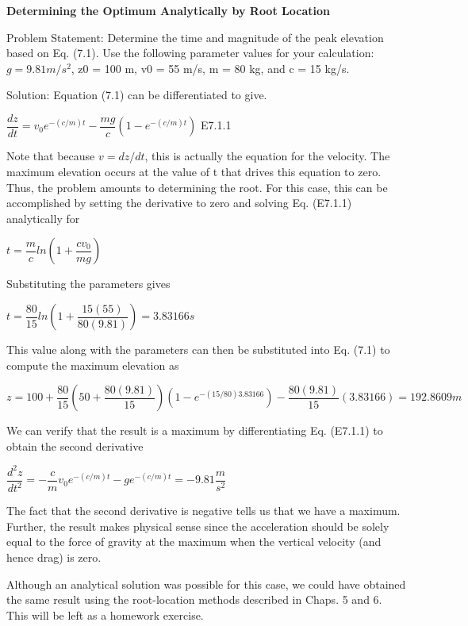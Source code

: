 \documentclass[../main.tex]{subfiles}
\begin{document}
\begin{example}
	\textbf{Determining the Optimum Analytically by Root Location}
	\smallskip
	
	\noindent Problem Statement:
	Determine the time and magnitude of the peak elevation based on
	Eq. (7.1). Use the following parameter values for your calculation: $g = 9.81 m/s^2$,
	z0 = 100 m, v0 = 55 m/s, m = 80 kg, and c = 15 kg/s.

	\noindent Solution: Equation (7.1) can be differentiated to give.
	\medskip

	$\dfrac{dz}{dt}=v_0e^{-(c/m)t}-\dfrac{mg}{c}(1-e^{-(c/m)t})$ \hfill{E7.1.1}
	\medskip

	\noindent Note that because $v = dz/dt$, this is actually the equation for the velocity. The maximum
	elevation occurs at the value of t that drives this equation to zero. Thus, the problem
	amounts to determining the root. For this case, this can be accomplished by setting the derivative
	to zero and solving Eq. (E7.1.1) analytically for
	\medskip

	$t = \dfrac{m}{c}ln(1+\dfrac{cv_0}{mg})$
	\medskip

	\noindent Substituting the parameters gives
	\medskip

	$t=\dfrac{80}{15}ln(1+\dfrac{15(55)}{80(9.81)})=3.83166s$
	\medskip

	\noindent This value along with the parameters can then be substituted into Eq. (7.1) to compute the
	maximum elevation as
	\medskip

	\noindent $z=100+\dfrac{80}{15}(50+\dfrac{80(9.81)}{15})(1-e^{-(15/80)3.83166})-\dfrac{80(9.81)}{15}(3.83166)=192.8609m$                      
	\medskip

	We can verify that the result is a maximum by differentiating Eq. (E7.1.1) to obtain the
	second derivative
	\medskip

	$\dfrac{d^2z}{dt^2}=-\dfrac{c}{m}v_0e^{-(c/m)t}-ge^{-(c/m)t}=-9.81\dfrac{m}{s^2} $
	\medskip

	\noindent The fact that the second derivative is negative tells us that we have a maximum. Further,
	the result makes physical sense since the acceleration should be solely equal to the force of
	gravity at the maximum when the vertical velocity (and hence drag) is zero.

	Although an analytical solution was possible for this case, we could have obtained the
	same result using the root-location methods described in Chaps. 5 and 6. This will be left
	as a homework exercise.
	\newline
\end{example}
\end{document}
